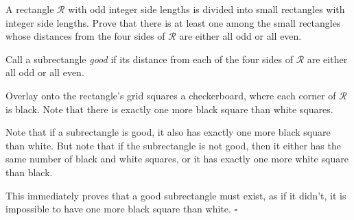 
\begin{problem}[ISL 2017 C1]
    A rectangle $\mathcal{R}$ with odd integer side lengths is divided into
    small rectangles with integer side lengths. Prove that there is at least
    one among the small rectangles whose distances from the four sides of
    $\mathcal R$ are either all odd or all even.
\end{problem}

\begin{solution}[Ritwin]
    Call a subrectangle \textit{good} if its distance from each of the four
    sides of $\mathcal R$ are either all odd or all even.
    
    Overlay onto the rectangle's grid squares a checkerboard, where each corner
    of $\mathcal R$ is black. Note that there is exactly one more black square
    than white squares.
    
    Note that if a subrectangle is good, it also has exactly one more black
    square than white. But note that if the subrectangle is not good, then it
    either has the same number of black and white squares, or it has exactly
    one more white square than black.
    
    This immediately proves that a good subrectangle must exist, as if it
    didn't, it is impossible to have one more black square than white. $\square$
\end{solution}
